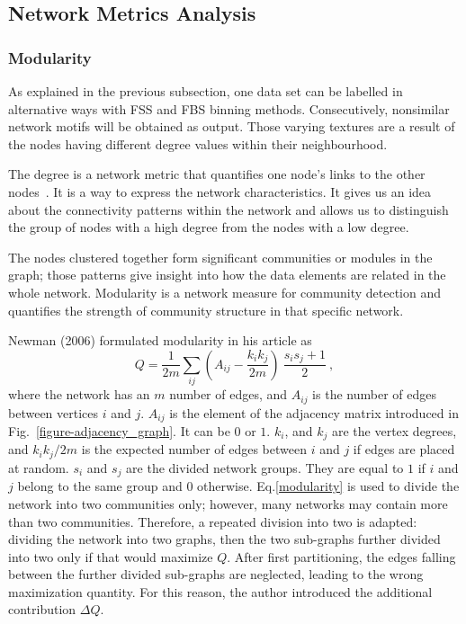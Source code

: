 \subsection*{Network Metrics Analysis}
%
\subsubsection*{Modularity}
As explained in the previous subsection, one data set can be labelled in alternative ways with FSS and FBS binning methods. Consecutively, nonsimilar network motifs will be obtained as output. Those varying textures are a result of the nodes having different degree values within their neighbourhood. 

The degree is a network metric that quantifies one node's links to the other nodes~\cite{Barabasi2016}. It is a way to express the network characteristics. It gives us an idea about the connectivity patterns within the network and allows us to distinguish the group of nodes with a high degree from the nodes with a low degree. 

The nodes clustered together form significant communities or modules in the graph; those patterns give insight into how the data elements are related in the whole network. Modularity is a network measure for community detection and quantifies the strength of community structure in that specific network.

Newman (2006) formulated modularity in his article as
\begin{equation} \tag{1}
	Q = \frac {1} {2 m}\sum_ {ij} (A_{ij} - \frac {k_{i} k_{j}}{2 m}) \
	\frac {s_{i} s_{j} + 1} {2}\ ,
	\label{modularity}
\end{equation}
where the network has an $m$ number of edges, and $A_{ij}$ is the number of edges between vertices $i$ and $j$. $A_{ij}$ is the element of the adjacency matrix introduced in Fig.~\ref{figure-adjacency_graph}. It can be $0$ or $1$. $k_{i}$, and $k_{j}$ are the vertex degrees, and ${k_{i} k_{j}}/{2 m}$ is the expected number of edges between $i$ and $j$ if edges are placed at random. $s_{i}$ and $s_{j}$ are the divided network groups. They are equal to $1$ if $i$ and $j$ belong to the same group and $0$ otherwise. Eq.\eqref{modularity} is used to divide the network into two communities only; however, many networks may contain more than two communities. Therefore, a repeated division into two is adapted: dividing the network into two graphs, then the two sub-graphs further divided into two only if that would maximize $Q$. After first partitioning, the edges falling between the further divided sub-graphs are neglected, leading to the wrong maximization quantity. For this reason, the author introduced the additional contribution $\Delta Q$.~\cite{Newman8577}

